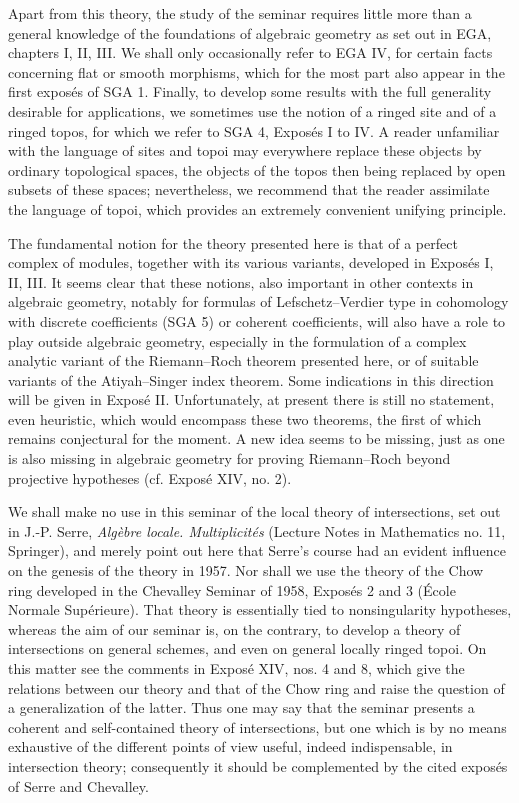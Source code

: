 Apart from this theory, the study of the seminar requires little more than a general knowledge of the foundations of algebraic geometry as set out in EGA, chapters I, II, III. We shall only occasionally refer to EGA IV, for certain facts concerning flat or smooth morphisms, which for the most part also appear in the first exposés of SGA 1. Finally, to develop some results with the full generality desirable for applications, we sometimes use the notion of a ringed site and of a ringed topos, for which we refer to SGA 4, Exposés I to IV. A reader unfamiliar with the language of sites and topoi may everywhere replace these objects by ordinary topological spaces, the objects of the topos then being replaced by open subsets of these spaces; nevertheless, we recommend that the reader assimilate the language of topoi, which provides an extremely convenient unifying principle.

The fundamental notion for the theory presented here is that of a perfect complex of modules, together with its various variants, developed in Exposés I, II, III. It seems clear that these notions, also important in other contexts in algebraic geometry, notably for formulas of Lefschetz--Verdier type in cohomology with discrete coefficients (SGA 5) or coherent coefficients, will also have a role to play outside algebraic geometry, especially in the formulation of a complex analytic variant of the Riemann--Roch theorem presented here, or of suitable variants of the Atiyah--Singer index theorem. Some indications in this direction will be given in Exposé II. Unfortunately, at present there is still no statement, even heuristic, which would encompass these two theorems, the first of which remains conjectural for the moment. A new idea seems to be missing, just as one is also missing in algebraic geometry for proving Riemann--Roch beyond projective hypotheses (cf. Exposé XIV, no. 2).

We shall make no use in this seminar of the local theory of intersections, set out in J.-P. Serre, \emph{Algèbre locale. Multiplicités} (Lecture Notes in Mathematics no. 11, Springer), and merely point out here that Serre's course had an evident influence on the genesis of the theory in 1957. Nor shall we use the theory of the Chow ring developed in the Chevalley Seminar of 1958, Exposés 2 and 3 (École Normale Supérieure). That theory is essentially tied to nonsingularity hypotheses, whereas the aim of our seminar is, on the contrary, to develop a theory of intersections on general schemes, and even on general locally ringed topoi. On this matter see the comments in Exposé XIV, nos. 4 and 8, which give the relations between our theory and that of the Chow ring and raise the question of a generalization of the latter. Thus one may say that the seminar presents a coherent and self-contained theory of intersections, but one which is by no means exhaustive of the different points of view useful, indeed indispensable, in intersection theory; consequently it should be complemented by the cited exposés of Serre and Chevalley.

